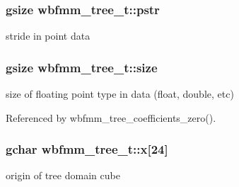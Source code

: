 \subsubsection[{pstr}]{\setlength{\rightskip}{0pt plus 5cm}gsize wbfmm\+\_\+tree\+\_\+t\+::pstr}\label{structwbfmm__tree__t_a96d1d01546cca1baf4a6a8c953ad1252}
stride in point data 
\subsubsection[{size}]{\setlength{\rightskip}{0pt plus 5cm}gsize wbfmm\+\_\+tree\+\_\+t\+::size}\label{structwbfmm__tree__t_a4bed752b3596b13ad7db8699d4f70060}
size of floating point type in data (float, double, etc) 

Referenced by wbfmm\+\_\+tree\+\_\+coefficients\+\_\+zero().

\subsubsection[{x}]{\setlength{\rightskip}{0pt plus 5cm}gchar wbfmm\+\_\+tree\+\_\+t\+::x[24]}\label{structwbfmm__tree__t_a44e44f2c0eabe36743d1f975b0d0798c}
origin of tree domain cube 